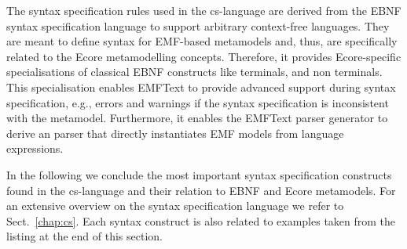 		The syntax specification rules used in the cs-language are derived from the
		EBNF syntax specification language to support arbitrary context-free languages.
		They are meant to define syntax for EMF-based metamodels and, thus, are
		specifically related to the Ecore metamodelling concepts. Therefore, it provides
		Ecore-specific specialisations of classical EBNF constructs like terminals, and
		non terminals. This specialisation enables EMFText to provide advanced support 
		during syntax specification, e.g., errors and warnings if the syntax
		specification is inconsistent with the metamodel. Furthermore, it enables the
		EMFText parser generator to derive an parser that directly instantiates EMF
		models from language expressions.


	In the following we conclude the most important syntax specification
	constructs found in the cs-language and their relation to EBNF and Ecore
	metamodels. For an extensive overview on the syntax specification language we
	refer to Sect.~\ref{chap:cs}. Each syntax construct is also related to examples
	taken from the listing at the end of this section.

